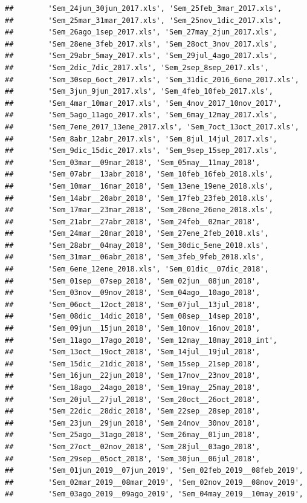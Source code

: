 \documentclass[
]{book}
\begin{document}
\begin{verbatim}
##        'Sem_24jun_30jun_2017.xls', 'Sem_25feb_3mar_2017.xls',
##        'Sem_25mar_31mar_2017.xls', 'Sem_25nov_1dic_2017.xls',
##        'Sem_26ago_1sep_2017.xls', 'Sem_27may_2jun_2017.xls',
##        'Sem_28ene_3feb_2017.xls', 'Sem_28oct_3nov_2017.xls',
##        'Sem_29abr_5may_2017.xls', 'Sem_29jul_4ago_2017.xls',
##        'Sem_2dic_7dic_2017.xls', 'Sem_2sep_8sep_2017.xls',
##        'Sem_30sep_6oct_2017.xls', 'Sem_31dic_2016_6ene_2017.xls',
##        'Sem_3jun_9jun_2017.xls', 'Sem_4feb_10feb_2017.xls',
##        'Sem_4mar_10mar_2017.xls', 'Sem_4nov_2017_10nov_2017',
##        'Sem_5ago_11ago_2017.xls', 'Sem_6may_12may_2017.xls',
##        'Sem_7ene_2017_13ene_2017.xls', 'Sem_7oct_13oct_2017.xls',
##        'Sem_8abr_12abr_2017.xls', 'Sem_8jul_14jul_2017.xls',
##        'Sem_9dic_15dic_2017.xls', 'Sem_9sep_15sep_2017.xls',
##        'Sem_03mar__09mar_2018', 'Sem_05may__11may_2018',
##        'Sem_07abr__13abr_2018', 'Sem_10feb_16feb_2018.xls',
##        'Sem_10mar__16mar_2018', 'Sem_13ene_19ene_2018.xls',
##        'Sem_14abr__20abr_2018', 'Sem_17feb_23feb_2018.xls',
##        'Sem_17mar__23mar_2018', 'Sem_20ene_26ene_2018.xls',
##        'Sem_21abr__27abr_2018', 'Sem_24feb__02mar_2018',
##        'Sem_24mar__28mar_2018', 'Sem_27ene_2feb_2018.xls',
##        'Sem_28abr__04may_2018', 'Sem_30dic_5ene_2018.xls',
##        'Sem_31mar__06abr_2018', 'Sem_3feb_9feb_2018.xls',
##        'Sem_6ene_12ene_2018.xls', 'Sem_01dic__07dic_2018',
##        'Sem_01sep__07sep_2018', 'Sem_02jun__08jun_2018',
##        'Sem_03nov__09nov_2018', 'Sem_04ago__10ago_2018',
##        'Sem_06oct__12oct_2018', 'Sem_07jul__13jul_2018',
##        'Sem_08dic__14dic_2018', 'Sem_08sep__14sep_2018',
##        'Sem_09jun__15jun_2018', 'Sem_10nov__16nov_2018',
##        'Sem_11ago__17ago_2018', 'Sem_12may__18may_2018_int',
##        'Sem_13oct__19oct_2018', 'Sem_14jul__19jul_2018',
##        'Sem_15dic__21dic_2018', 'Sem_15sep__21sep_2018',
##        'Sem_16jun__22jun_2018', 'Sem_17nov__23nov_2018',
##        'Sem_18ago__24ago_2018', 'Sem_19may__25may_2018',
##        'Sem_20jul__27jul_2018', 'Sem_20oct__26oct_2018',
##        'Sem_22dic__28dic_2018', 'Sem_22sep__28sep_2018',
##        'Sem_23jun__29jun_2018', 'Sem_24nov__30nov_2018',
##        'Sem_25ago__31ago_2018', 'Sem_26may__01jun_2018',
##        'Sem_27oct__02nov_2018', 'Sem_28jul__03ago_2018',
##        'Sem_29sep__05oct_2018', 'Sem_30jun__06jul_2018',
##        'Sem_01jun_2019__07jun_2019', 'Sem_02feb_2019__08feb_2019',
##        'Sem_02mar_2019__08mar_2019', 'Sem_02nov_2019__08nov_2019',
##        'Sem_03ago_2019__09ago_2019', 'Sem_04may_2019__10may_2019',

\end{verbatim}
\end{document}
